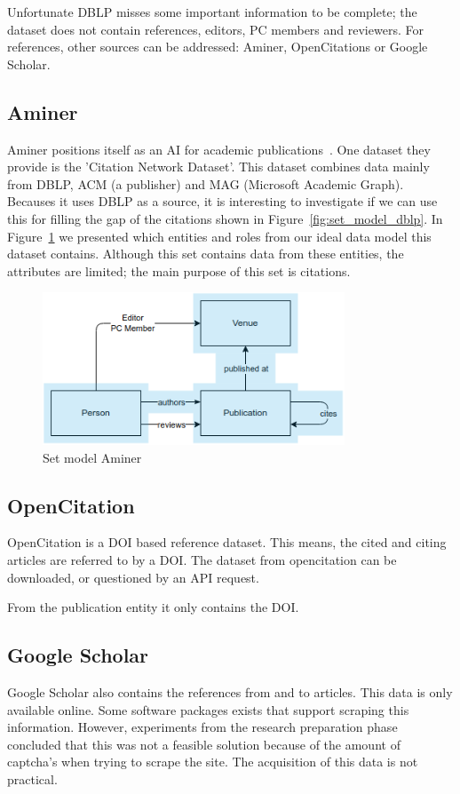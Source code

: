 \documentclass{ou-report}
\newcommand{\doi}{{DOI}}
\newcommand{\api}{API}
\begin{document}
Unfortunate DBLP misses some important information to be complete; the dataset
does not contain references, editors, PC members and reviewers. For 
references, other sources can be addressed: Aminer, OpenCitations or Google 
Scholar.

\subsection{Aminer}
Aminer positions itself as an AI for academic publications~\cite{Tang:08KDD}. 
One dataset they provide is the 
'Citation Network Dataset'. This dataset combines data mainly from DBLP, ACM (a 
publisher) and MAG (Microsoft Academic Graph). Becauses it uses DBLP as a 
source, it is interesting to 
investigate if we can use this for filling the gap of the citations shown in 
Figure~\ref{fig:set_model_dblp}.
In Figure~\ref{fig:set_model_aminer} we presented which entities and roles
from our ideal data model this dataset contains. Although this set contains data
from these entities, the attributes are limited; the main purpose of this set is
citations.
\begin{figure}[H]
\includegraphics[width=9cm]{images/set_model_aminer.png}
\centering
\caption{Set model Aminer}
\label{fig:set_model_aminer}
\end{figure}


\subsection{OpenCitation} 
OpenCitation is a \doi{} based reference dataset. This means, the cited and citing 
articles are referred to by a \doi{}. 
The dataset from opencitation can be downloaded, or questioned by an \api{} request. 

From the publication entity it only contains the \doi{}.


\subsection{Google Scholar}
\label{subsec:google_scholar}
Google Scholar also contains the references from and to articles. This data is 
only available online. Some software packages exists that support scraping this
information. However, experiments from the research preparation phase concluded
that this was not a feasible solution because of the amount of captcha's when
trying to scrape the site. The acquisition of this data is not practical.
\end{document}
